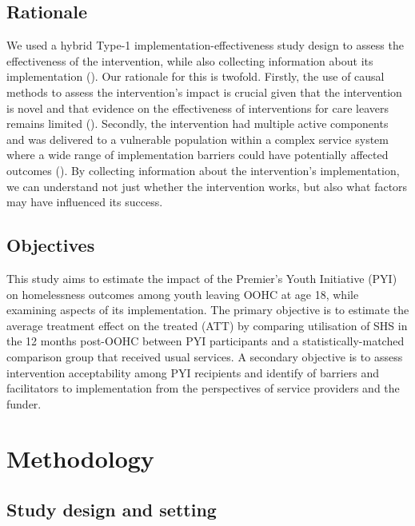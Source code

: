 \documentclass[
  jou,
  floatsintext,
  longtable,
  nolmodern,
  notxfonts,
  notimes,
  colorlinks=true,linkcolor=blue,citecolor=blue,urlcolor=blue]{apa7}
\begin{document}
\subsection{Rationale}\label{rationale}

We used a hybrid Type-1 implementation-effectiveness study design to
assess the effectiveness of the intervention, while also collecting
information about its implementation
(). Our rationale for this is
twofold. Firstly, the use of causal methods to assess the intervention's
impact is crucial given that the intervention is novel and that evidence
on the effectiveness of interventions for care leavers remains limited
(). Secondly, the intervention had multiple active components and
was delivered to a vulnerable population within a complex service system
where a wide range of implementation barriers could have potentially
affected outcomes
(). By collecting information about the
intervention's implementation, we can understand not just whether the
intervention works, but also what factors may have influenced its
success.

\subsection{Objectives}\label{objectives}

This study aims to estimate the impact of the Premier's Youth Initiative
(PYI) on homelessness outcomes among youth leaving OOHC at age 18, while
examining aspects of its implementation. The primary objective is to
estimate the average treatment effect on the treated (ATT) by comparing
utilisation of SHS in the 12 months post-OOHC between PYI participants
and a statistically-matched comparison group that received usual
services. A secondary objective is to assess intervention acceptability
among PYI recipients and identify of barriers and facilitators to
implementation from the perspectives of service providers and the
funder.

\section{Methodology}\label{methodology}

\subsection{Study design and setting}\label{study-design-and-setting}
\end{document}
